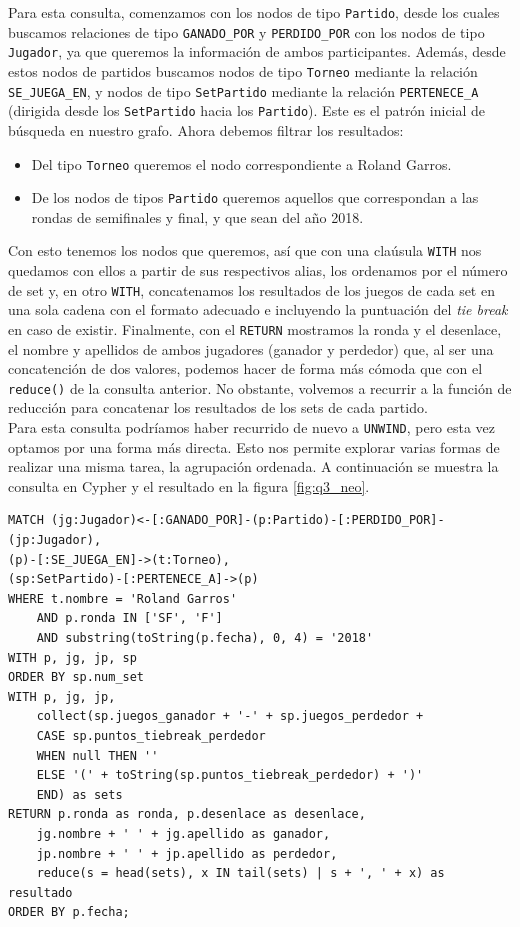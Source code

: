 Para esta consulta, comenzamos con los nodos de tipo \texttt{Partido}, desde los cuales buscamos relaciones de tipo \texttt{GANADO\_POR} y \texttt{PERDIDO\_POR} con los nodos de tipo \texttt{Jugador}, ya que queremos la información de ambos participantes. Además, desde estos nodos de partidos buscamos nodos de tipo \texttt{Torneo} mediante la relación \texttt{SE\_JUEGA\_EN}, y nodos de tipo \texttt{SetPartido} mediante la relación \texttt{PERTENECE\_A} (dirigida desde los \texttt{SetPartido} hacia los \texttt{Partido}). Este es el patrón inicial de búsqueda en nuestro grafo. Ahora debemos filtrar los resultados: 
\begin{itemize}
\item Del tipo \texttt{Torneo} queremos el nodo correspondiente a Roland Garros.
\item De los nodos de tipos \texttt{Partido} queremos aquellos que correspondan a las rondas de semifinales y final, y que sean del año 2018.
\end{itemize}

Con esto tenemos los nodos que queremos, así que con una claúsula \texttt{WITH} nos quedamos con ellos a partir de sus respectivos alias, los ordenamos por el número de set y, en otro \texttt{WITH}, concatenamos los resultados de los juegos de cada set en una sola cadena con el formato adecuado e incluyendo la puntuación del \textit{tie break} en caso de existir. Finalmente, con el \texttt{RETURN} mostramos la ronda y el desenlace, el nombre y apellidos de ambos jugadores (ganador y perdedor) que, al ser una concatención de dos valores, podemos hacer de forma más cómoda que con el \texttt{reduce()} de la consulta anterior. No obstante, volvemos a recurrir a la función de reducción para concatenar los resultados de los sets de cada partido. \\

Para esta consulta podríamos haber recurrido de nuevo a \texttt{UNWIND}, pero esta vez optamos por una forma más directa. Esto nos permite explorar varias formas de realizar una misma tarea, la agrupación ordenada. A continuación se muestra la consulta en Cypher y el resultado en la figura \ref{fig:q3_neo}.

\newpage

\begin{verbatim}
MATCH (jg:Jugador)<-[:GANADO_POR]-(p:Partido)-[:PERDIDO_POR]-(jp:Jugador),
(p)-[:SE_JUEGA_EN]->(t:Torneo),
(sp:SetPartido)-[:PERTENECE_A]->(p)
WHERE t.nombre = 'Roland Garros'
    AND p.ronda IN ['SF', 'F']
    AND substring(toString(p.fecha), 0, 4) = '2018'
WITH p, jg, jp, sp
ORDER BY sp.num_set
WITH p, jg, jp,
    collect(sp.juegos_ganador + '-' + sp.juegos_perdedor +
    CASE sp.puntos_tiebreak_perdedor
    WHEN null THEN ''
    ELSE '(' + toString(sp.puntos_tiebreak_perdedor) + ')'
    END) as sets
RETURN p.ronda as ronda, p.desenlace as desenlace,
    jg.nombre + ' ' + jg.apellido as ganador,
    jp.nombre + ' ' + jp.apellido as perdedor,
    reduce(s = head(sets), x IN tail(sets) | s + ', ' + x) as resultado
ORDER BY p.fecha;
\end{verbatim}

